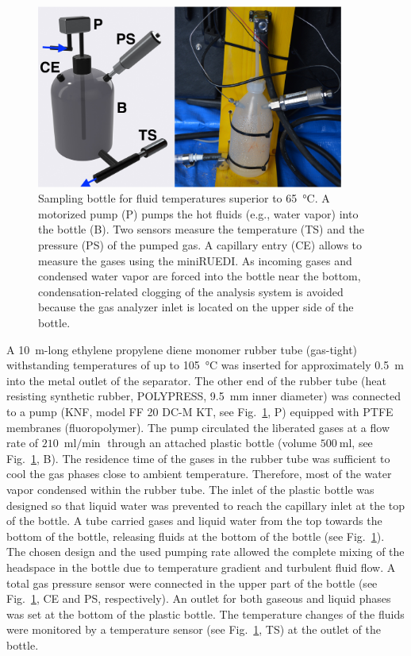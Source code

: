 \begin{figure}[h!]
\begin{center}
\includegraphics[width=0.9\textwidth]{chapters/02_chap1/figures/figure_2.jpeg}
\end{center}
\caption{Sampling bottle for fluid temperatures superior to \SI{65}{\celsius}.
A motorized pump (P) pumps the hot fluids (e.g., water vapor) into the bottle (B).
Two sensors measure the temperature (TS) and the pressure (PS) of the pumped gas.
A capillary entry (CE) allows to measure the gases using the miniRUEDI. 
As incoming gases and condensed water vapor are forced into the bottle near the bottom, condensation-related clogging of the analysis system is avoided because the gas analyzer inlet is located on the upper side of the bottle.
}
\label{fig:2}
\end{figure}

A \SI{10}{\m}-long ethylene propylene diene monomer rubber tube (gas-tight) withstanding temperatures of up to \SI{105}{\celsius} was inserted for approximately \SI{0.5}{\m} into the metal outlet of the separator.
The other end of the rubber tube (heat resisting synthetic rubber, POLYPRESS, \SI{9.5}{\mm} inner diameter) was connected to a pump (KNF, model FF 20 DC-M KT, see Fig.~\ref{fig:2}, P) equipped with PTFE membranes (fluoropolymer).
The pump circulated the liberated gases at a flow rate of $\SI{210}{\milli\litre\per\min}$ through an attached plastic bottle (volume $\SI{500}{\milli\litre}$, see Fig.~\ref{fig:2}, B).
The residence time of the gases in the rubber tube was sufficient to cool the gas phases close to ambient temperature.
Therefore, most of the water vapor condensed within the rubber tube.
The inlet of the plastic bottle was designed so that liquid water was prevented to reach the capillary inlet at the top of the bottle. 
A tube carried gases and liquid water from the top towards the bottom of the bottle, releasing fluids at the bottom of the bottle (see Fig.~\ref{fig:2}).
The chosen design and the used pumping rate allowed the complete mixing of the headspace in the bottle due to temperature gradient and turbulent fluid flow.
A total gas pressure sensor were connected in the upper part of the bottle (see Fig.~\ref{fig:2}, CE and PS, respectively).
An outlet for both gaseous and liquid phases was set at the bottom of the plastic bottle.
The temperature changes of the fluids were monitored by a temperature sensor (see Fig.~\ref{fig:2}, TS) at the outlet of the bottle.

